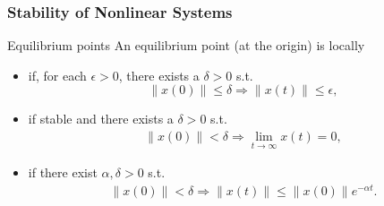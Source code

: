\begin{frame}
  \frametitle{Stability of Nonlinear Systems}
  \begin{block}{Equilibrium points}
    An equilibrium point (at the origin) is locally
    \begin{itemize}
    \item {} if, for each $\epsilon > 0$, there exists a $\delta > 0$ s.t. $$\|x(0)\| \leq \delta  \Rightarrow \|x(t)\| \leq \epsilon,$$
      \item {} if stable and there exists a $\delta > 0$ s.t.
        \begin{align*}
          \|x(0)\| < \delta \Rightarrow \lim_{t \to \infty} x(t) = 0,
        \end{align*}
      \item {} if there exist $\alpha, \delta > 0$ s.t.
        \begin{align*}
          \|x(0)\| < \delta \Rightarrow \| x(t) \| \leq \| x(0) \| e^{-\alpha t}.
        \end{align*}
    \end{itemize}
  \end{block}
\end{frame}


